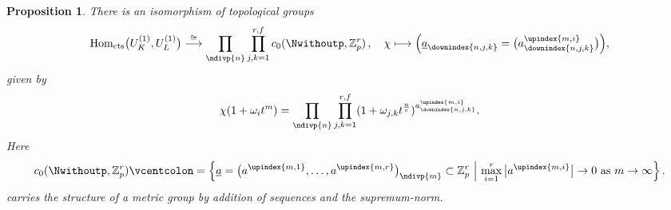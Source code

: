 \documentclass[a4paper, reqno, 10pt]{amsart}
\newtheorem{proposition}[theorem]{Proposition}
\theoremstyle{definition}
\numberwithin{equation}{section}
\newcommand{\cont}{{\mathrm{cts}}}
\newcommand{\defeq}{\vcentcolon=}
\newcommand{\Hom}{{\mathrm{Hom}}}
\newcommand{\lra}{\longrightarrow}
\newcommand{\lto}{\longmapsto}
\newcommand{\ra}{\rightarrow}
\newcommand{\ul}[1]{{\underline{#1}}}
\let\originalmiddle\middle
\renewcommand{\middle}[1]{\,\originalmiddle#1\,}
\newcommand{\BZ}{{\mathbb {Z}}}
\begin{document}
\begin{proposition}\label{Prop A2 - Continuous characters in equal characteristic}
	There is an isomorphism of topological groups
	\begin{equation}\label{Eq A2 - Description of continuous characters in equal characteristic}
		\Hom_\cont \big(U_K^{(1)},U_L^{(1)} \big) \overset{\cong}{\lra} \prod_\ndivp{n} \prod_{j,k=1}^{r,f}  c_0(\Nwithoutp,\BZ_p^r) \,,\quad
		\chi \lto \Big( \ul{a}_\downindex{{n,j,k}} = \big( a_\downindex{{n,j,k}}^\upindex{{m,i}} \big) \Big) ,
	\end{equation}
	given by
	\[ \chi(1+\omega_i t^m) = \prod_\ndivp{n}\prod_{j,k=1}^{r,f} (1+\omega_{j,k} t^{\frac{n}{e}} )^{a_\downindex{{n,j,k}}^\upindex{m,i}} . \]
	Here
	\begin{equation*}
		c_0(\Nwithoutp,\BZ_p^r) \defeq \left\{ \ul{a} = \big( a^\upindex{{m,1}},\ldots,a^\upindex{{m,r}} \big)_\ndivp{m} \subset \BZ_p^r \middle{|} \max_{i=1}^r \big\lvert a^\upindex{{m,i}} \big\rvert \ra 0 \text{ as $m\ra \infty$} \right\}.
	\end{equation*}
	carries the structure of a metric group by addition of sequences and the supremum-norm.
\end{proposition}
\end{document}
